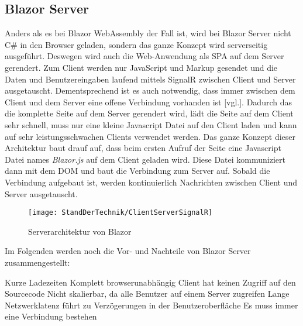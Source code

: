 \subsection{Blazor Server}
Anders als es bei Blazor WebAssembly der Fall ist, wird bei Blazor Server nicht C\# in den
Browser geladen, sondern das ganze Konzept wird serverseitig ausgeführt. Deswegen wird auch die
Web-Anwendung als SPA auf dem Server gerendert. Zum Client werden nur JavaScript und Markup
gesendet und die Daten und Benutzereingaben laufend mittels SignalR zwischen Client und Server
ausgetauscht. Dementsprechend ist es auch notwendig, dass immer zwischen dem Client und dem Server
eine offene Verbindung vorhanden ist \cite{HierKommtBlazor}[vgl.].
\newline
\newline
Dadurch das die komplette Seite auf dem Server gerendert wird, lädt die Seite auf dem Client sehr
schnell, muss nur eine kleine Javascript Datei auf den Client laden und kann auf sehr
leistungsschwachen Clients verwendet werden.
\newline
\newline
Das ganze Konzept dieser Architektur baut drauf auf, dass beim ersten Aufruf der Seite eine
Javascript Datei names \emph{Blazor.js} auf dem Client geladen wird. Diese Datei kommuniziert dann
mit dem DOM und baut die Verbindung zum Server auf. Sobald die Verbindung aufgebaut ist, werden
kontinuierlich Nachrichten zwischen Client und Server ausgetauscht.

\begin{figure}[h]
    \centering
    \texttt{[image: StandDerTechnik/ClientServerSignalR]}
    \caption[Serverarchitektur von Blazor]{Serverarchitektur von Blazor}
    \label{img:clientserversignalR}
\end{figure}

Im Folgenden werden noch die Vor- und Nachteile von Blazor Server zusammengestellt:
\begin{itemize}
    \pro Kurze Ladezeiten
    \pro Komplett browserunabhängig
    \pro Client hat keinen Zugriff auf den Sourcecode
    \con Nicht skalierbar, da alle Benutzer auf einem Server zugreifen
    \con Lange Netzwerklatenz führt zu Verzögerungen in der Benutzeroberfläche
    \con Es muss immer eine Verbindung bestehen
\end{itemize}